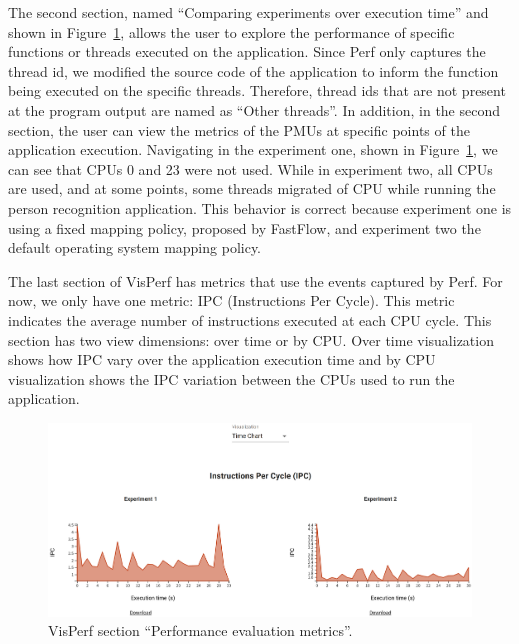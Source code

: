 The second section, named ``Comparing experiments over execution time'' and shown in Figure~\ref{figure:visperf-section-2}, allows the user to explore the performance of specific functions or threads executed on the application. Since Perf only captures the thread id, we modified the source code of the application to inform the function being executed on the specific threads. Therefore, thread ids that are not present at the program output are named as ``Other threads''. In addition, in the second section, the user can view the metrics of the PMUs at specific points of the application execution. Navigating in the experiment one, shown in Figure~\ref{figure:visperf-section-2}, we can see that CPUs 0 and 23 were not used. While in experiment two, all CPUs are used, and at some points, some threads migrated of CPU while running the person recognition application. This behavior is correct because experiment one is using a fixed mapping policy, proposed by FastFlow, and experiment two the default operating system mapping policy.

The last section of VisPerf has metrics that use the events captured by Perf. For now, we only have one metric: IPC (Instructions Per Cycle). This metric indicates the average number of instructions executed at each CPU cycle. This section has two view dimensions: over time or by CPU. Over time visualization shows how IPC vary over the application execution time and by CPU visualization shows the IPC variation between the CPUs used to run the application.

\begin{figure}[ht]
    \centering
    \includegraphics[width=1.0\columnwidth]{../pictures/visperf-section-3.png}
    \caption{VisPerf section ``Performance evaluation metrics''.}
    \label{figure:visperf-section-2}
\end{figure}
